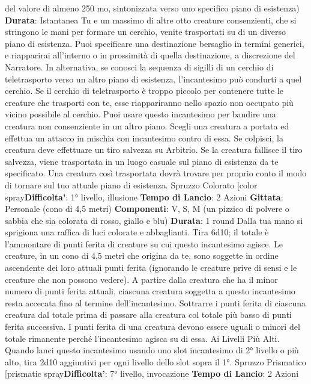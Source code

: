 \begin{multicols}{2}
del valore di almeno 250 mo, sintonizzata verso uno
specifico piano di esistenza)
\textbf{Durata}: Istantanea
Tu e un massimo di altre otto creature consenzienti,
che si stringono le mani per formare un cerchio, venite
trasportati su di un diverso piano di esistenza. Puoi
specificare una destinazione bersaglio in termini
generici, e riapparirai all’interno o in prossimità di quella
destinazione, a discrezione del Narratore.
In alternativa, se conosci la sequenza di sigilli di un
cerchio di teletrasporto verso un altro piano di
esistenza, l’incantesimo può condurti a quel cerchio. Se
il cerchio di teletrasporto è troppo piccolo per contenere
tutte le creature che trasporti con te, esse riappariranno
nello spazio non occupato più vicino possibile al
cerchio.
Puoi usare questo incantesimo per bandire una
creatura non consenziente in un altro piano. Scegli una
creatura a portata ed effettua un attacco in mischia con
incantesimo contro di essa. Se colpisci, la creatura
deve effettuare un tiro salvezza su Arbitrio. Se la
creatura fallisce il tiro salvezza, viene trasportata in un
luogo casuale sul piano di esistenza da te specificato.
Una creatura così trasportata dovrà trovare per proprio
conto il modo di tornare sul tuo attuale piano di
esistenza.
Spruzzo Colorato
[color spray\textbf{Difficolta'}:
1° livello, illusione
\textbf{Tempo di Lancio}: 2 Azioni
\textbf{Gittata}: Personale (cono di 4,5 metri)
\textbf{Componenti}: V, S, M (un pizzico di polvere o sabbia
che sia colorata di rosso, giallo e blu)
\textbf{Durata}: 1 round
Dalla tua mano si sprigiona una raffica di luci colorate e
abbaglianti. Tira 6d10; il totale è l’ammontare di punti
ferita di creature su cui questo incantesimo agisce. Le
creature, in un cono di 4,5 metri che origina da te, sono
soggette in ordine ascendente dei loro attuali punti
ferita (ignorando le creature prive di sensi e le creature
che non possono vedere).
A partire dalla creatura che ha il minor numero di punti
ferita attuali, ciascuna creatura soggetta a questo
incantesimo resta accecata fino al termine
dell’incantesimo. Sottrarre i punti ferita di ciascuna
creatura dal totale prima di passare alla creatura col
totale più basso di punti ferita successiva. I punti ferita
di una creatura devono essere uguali o minori del totale
rimanente perché l’incantesimo agisca su di essa.
Ai Livelli Più Alti. Quando lanci questo incantesimo
usando uno slot incantesimo di 2° livello o più alto, tira
2d10 aggiuntivi per ogni livello dello slot sopra il 1°.
Spruzzo Prismatico
[prismatic spray\textbf{Difficolta'}:
7° livello, invocazione
\textbf{Tempo di Lancio}: 2 Azioni

\end{multicols}
